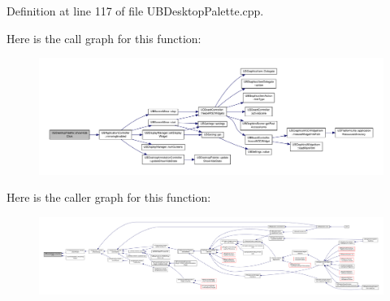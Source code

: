Definition at line 117 of file U\-B\-Desktop\-Palette.\-cpp.



Here is the call graph for this function\-:
\nopagebreak
\begin{figure}[H]
\begin{center}
\leavevmode
\includegraphics[width=350pt]{d7/dfa/class_u_b_desktop_palette_ae18c3f2e1a1cca67dd75a4644785b500_cgraph}
\end{center}
\end{figure}




Here is the caller graph for this function\-:
\nopagebreak
\begin{figure}[H]
\begin{center}
\leavevmode
\includegraphics[width=350pt]{d7/dfa/class_u_b_desktop_palette_ae18c3f2e1a1cca67dd75a4644785b500_icgraph}
\end{center}
\end{figure}


